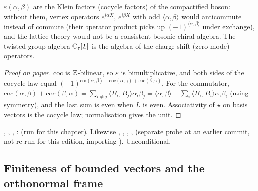 \begin{physics}
$\varepsilon(\alpha,\beta)$ are the Klein factors (cocycle factors) of the compactified boson: without them,
vertex operators $e^{i\alpha X}$, $e^{i\beta X}$ with odd $\langle\alpha,\beta\rangle$ would anticommute instead of commute
(their operator product picks up $(-1)^{\langle\alpha,\beta\rangle}$ under exchange), and the lattice theory would not
be a consistent bosonic chiral algebra. The twisted group algebra ${\mathbb{C}}_\varepsilon[L]$ is the algebra of the
charge-shift (zero-mode) operators.
\end{physics}

\begin{proof}[Proof on paper]
$\mathrm{coc}$ is ${\mathbb{Z}}$-bilinear, so $\varepsilon$ is bimultiplicative, and both sides of the cocycle law equal
$(-1)^{\mathrm{coc}(\alpha,\beta)+\mathrm{coc}(\alpha,\gamma)+\mathrm{coc}(\beta,\gamma)}$. For the commutator,
$\mathrm{coc}(\alpha,\beta)+\mathrm{coc}(\beta,\alpha) = \sum_{i\ne j}\langle B_i,B_j\rangle\alpha_i\beta_j =
\langle\alpha,\beta\rangle-\sum_i\langle B_i,B_i\rangle\alpha_i\beta_i$ (using symmetry), and the last sum is even when $L$ is
even. Associativity of $\star$ on basis vectors is the cocycle law; normalisation gives the unit.
\end{proof}

\begin{status}
\allowbreak{}\allowbreak{}\allowbreak{}, \allowbreak{}\allowbreak{}\allowbreak{},
\allowbreak{}\allowbreak{}\allowbreak{}, \allowbreak{}\allowbreak{}\allowbreak{}:
 (run for this chapter). Likewise \allowbreak{}\allowbreak{}\allowbreak{}\allowbreak{},
\allowbreak{}\allowbreak{}, \allowbreak{}\allowbreak{}, \allowbreak{}\allowbreak{},
 (separate probe at an earlier commit, not re-run for this edition, importing ). Unconditional.
\end{status}

\subsection{Finiteness of bounded vectors and the orthonormal frame}

